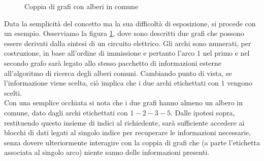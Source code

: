 \begin{figure}[b]
 \centering
 \hspace{25pt}
 \caption{Coppia di grafi con alberi in comune}
 \label{fig:gigv}
\end{figure}

Data la semplicità del concetto ma la sua difficoltà di esposizione, si procede con un esempio. Osserviamo la figura \ref{fig:gigv}, dove sono descritti due grafi che possono essere derivati dalla sintesi di un circuito elettrico. Gli archi sono numerati, per costruzione, in base all'ordine di immissione e pertanto l'arco $1$ nel primo e nel secondo grafo sarà legato allo stesso pacchetto di informazioni esterne all'algoritmo di ricerca degli alberi comuni. Cambiando punto di vista, se l'informazione viene scelta, ciò implica che i due archi etichettati con $1$ vengono scelti.\\
Con una semplice occhiata si nota che i due grafi hanno almeno un albero in comune, dato dagli archi etichettati con $1-2-3-5$. Dalle ipotesi sopra, restituendo questo insieme di indici al richiedente, sarà sufficiente accedere ai blocchi di dati legati al singolo indice per recuperare le informazioni necessarie, senza dovere ulteriormente interagire con la coppia di grafi che (a parte l'etichetta associata al singolo arco) niente sanno delle informazioni presenti.

